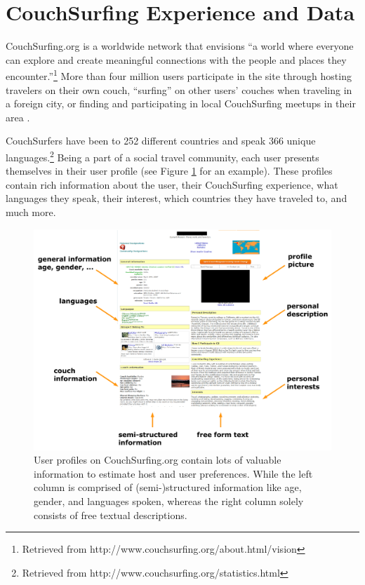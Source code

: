 \section{CouchSurfing Experience and Data} \label{sec:data}

CouchSurfing.org is a worldwide network that envisions ``a world where everyone can explore and create meaningful connections with the people and places they encounter.''\footnote{Retrieved from http://www.couchsurfing.org/about.html/vision}
More than four million users participate in the site through hosting travelers on their own couch, ``surfing'' on other users' couches when traveling in a foreign city, or finding and participating in local CouchSurfing meetups in their area \cite{Lauterbach2009}.

CouchSurfers have been to 252 different countries and speak 366 unique languages.\footnote{Retrieved from http://www.couchsurfing.org/statistics.html}
Being a part of a social travel community, each user presents themselves in their user profile (see Figure \ref{fig:csprofile} for an example). These profiles contain rich information about the user, their CouchSurfing experience, what languages they speak, their interest, which countries they have traveled to, and much more.

\begin{figure}[ht]
\centering
\includegraphics[width=1\linewidth]{./figures/csprofile.pdf}
\caption{User profiles on CouchSurfing.org contain lots of valuable information to estimate host and user preferences. While the left column is comprised of (semi-)structured information like age, gender, and languages spoken, whereas the right column solely consists of free textual descriptions.}
\label{fig:csprofile}
\end{figure}

